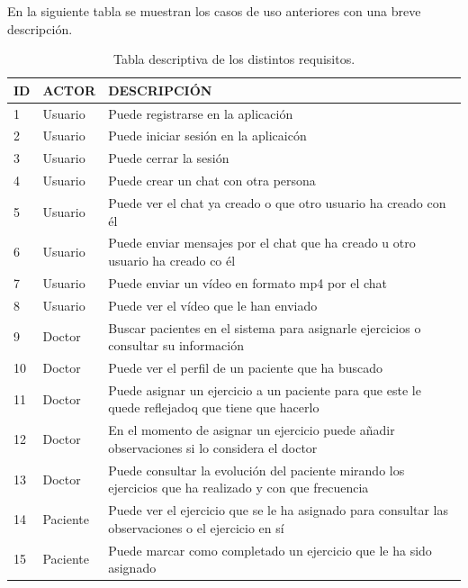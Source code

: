 \medskip
En la siguiente tabla se muestran los casos de uso anteriores con una breve descripción.
\begin{table}
    \begin{tabular}{|llp{12cm}|}
        \hline
        ID & ACTOR    & DESCRIPCIÓN \\ \hline
        1  & Usuario  & Puede registrarse en la aplicación \\ \hline
        2  & Usuario  & Puede iniciar sesión en la aplicaicón \\ \hline
        3  & Usuario  & Puede cerrar la sesión \\ \hline
        4  & Usuario  & Puede crear un chat con otra persona \\ \hline
        5  & Usuario  & Puede ver el chat ya creado o que otro usuario ha creado con él \\ \hline
        6  & Usuario  & Puede enviar mensajes por el chat que ha creado u otro usuario
        ha creado co él \\ \hline
        7  & Usuario  & Puede enviar un vídeo en formato mp4 por el chat \\ \hline
        8  & Usuario  & Puede ver el vídeo que le han enviado \\ \hline
        9  & Doctor   & Buscar pacientes en el sistema para asignarle ejercicios o
        consultar su información \\ \hline
        10 & Doctor   & Puede ver el perfil de un paciente que ha buscado \\ \hline
        11 & Doctor   & Puede asignar un ejercicio a un paciente para que este le quede
        reflejadoq que tiene que hacerlo \\ \hline
        12 & Doctor   & En el momento de asignar un ejercicio puede añadir observaciones
        si lo considera el doctor \\ \hline
        13 & Doctor   & Puede consultar la evolución del paciente mirando los ejercicios
        que ha realizado y con que frecuencia \\ \hline
        14 & Paciente & Puede ver el ejercicio que se le ha asignado para consultar las
        observaciones o el ejercicio en sí \\ \hline
        15 & Paciente & Puede marcar como completado un ejercicio que le ha sido asignado \\ \hline
    \end{tabular}

    \caption{Tabla descriptiva de los distintos requisitos.}\label{tabla-requisitos}
\end{table}



